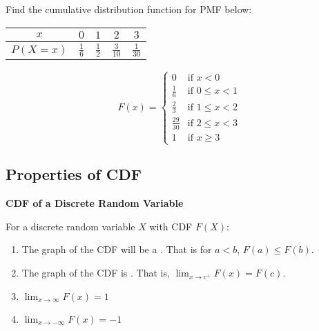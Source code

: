 \begin{example}
    Find the cumulative distribution function for PMF below:

    \begin{center}
        \begin{tabular}{ c | c c c c}
            $x$        & $0$           & $1$           & $2$            & $3$            \\
            \hline
            $P(X = x)$ & $\frac{1}{6}$ & $\frac{1}{2}$ & $\frac{3}{10}$ & $\frac{1}{30}$ \\
        \end{tabular}
    \end{center}
    
    $$F(x) = \begin{cases}
        0                        & \text{if } x < 0       \\
        \textstyle \frac{1}{6}   & \text{if } 0 \le x < 1 \\
        \textstyle \frac{2}{3}   & \text{if } 1 \le x < 2 \\
        \textstyle \frac{29}{30} & \text{if } 2 \le x < 3 \\
        1                        & \text{if } x \ge 3
    \end{cases}$$
\end{example}

\subsection{Properties of CDF}

\textbf{CDF of a Discrete Random Variable}

For a discrete random variable $X$ with CDF $F(X)$:

\begin{enumerate} \everymath{\displaystyle}
    \item The graph of the CDF will be a . That is for $a < b$, $F(a) \le F(b)$. 
    \item The graph of the CDF is . That is, $\lim_{x \to c^+} F(x) = F(c)$. 
    \item $\lim_{x \to \infty} F(x) = 1$
    \item $\lim_{x \to -\infty} F(x) = -1$
\end{enumerate}

